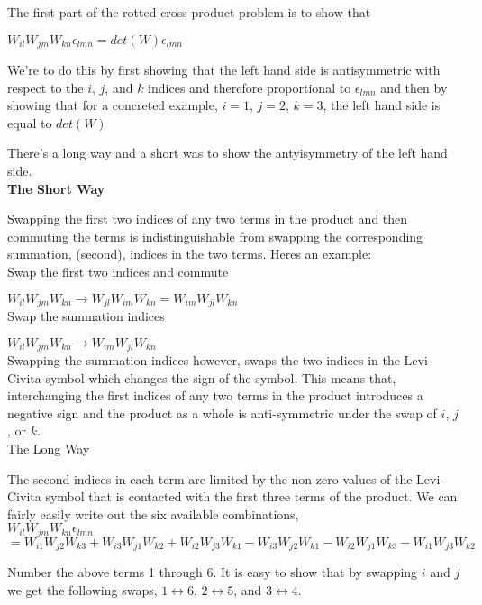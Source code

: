 \documentclass[prb,preprint]
{revtex4-1}
\begin{document}
The first part of the rotted cross product problem is to show that

$W_{il}W_{jm}W_{kn}\epsilon_{lmn} = det\left(W\right)\epsilon_{lmn}$

We're to do this by first showing that the left hand side is antisymmetric with respect to the $i$, $j$, and $k$ indices and therefore proportional to $\epsilon_{lmn}$ and then by showing that for a concreted example, $i=1$, $j=2$, $k=3$, the left hand side is equal to $det\left(W\right)$

There's a long way and a short was to show the antyisymmetry of the left hand side.\\


\textbf{The Short Way}

Swapping the first two indices of any two terms in the product and then commuting the terms is indistinguishable from swapping the corresponding summation, (second), indices in the two terms.  Heres an example:\\

Swap the first two indices and commute

$W_{il}W_{jm}W_{kn} \rightarrow W_{jl}W_{im}W_{kn} = W_{im}W_{jl}W_{kn}$
\\

Swap the summation indices

$W_{il}W_{jm}W_{kn} \rightarrow W_{im}W_{jl}W_{kn}$
\\

Swapping the summation indices however, swaps the two indices in the Levi-Civita symbol which changes the sign of the symbol.  This means that, interchanging the first indices of any two terms in the product introduces a negative sign and the product as a whole is anti-symmetric under the swap of $i$, $j$, or $k$.
\\

The Long Way

The second indices in each term are limited by the non-zero values of the Levi-Civita symbol that is contacted with the first three terms of the product.  We can fairly easily write out the six available combinations,\\
$W_{il}W_{jm}W_{kn}\epsilon_{lmn}$\\
$= W_{i1}W_{j2}W_{k3} + W_{i3}W_{j1}W_{k2} + W_{i2}W_{j3}W_{k1} - W_{i3}W_{j2}W_{k1} - W_{i2}W_{j1}W_{k3} - W_{i1}W_{j3}W_{k2}$

Number the above terms 1 through 6.  It is easy to show that by swapping $i$ and $j$ we get the following swaps, $1\leftrightarrow 6$,  $2\leftrightarrow 5$, and $3\leftrightarrow 4$.  \\
\end{document}
